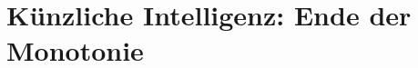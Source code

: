 \documentclass[../Mappe.tex]{subfiles}
\begin{document}
\section*{Künzliche Intelligenz: Ende der Monotonie}
\end{document}
